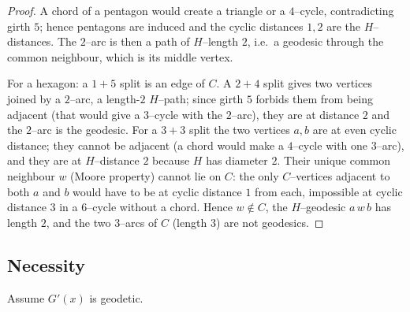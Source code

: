 \documentclass{amsart}
\theoremstyle{definition}
\begin{document}
\begin{proof}
A chord of a pentagon would create a triangle or a $4$--cycle, contradicting
girth $5$; hence pentagons are induced and the cyclic distances $1,2$ are the
$H$--distances. The $2$--arc is then a path of $H$--length $2$, i.e.\ a geodesic
through the common neighbour, which is its middle vertex.

For a hexagon: a $1{+}5$ split is an edge of $C$. A $2{+}4$ split gives two
vertices joined by a $2$--arc, a length-$2$ $H$--path; since girth $5$ forbids
them from being adjacent (that would give a $3$--cycle with the $2$--arc), they
are at distance $2$ and the $2$--arc is the geodesic. For a $3{+}3$ split the two
vertices $a,b$ are at even cyclic distance; they cannot be adjacent (a chord
would make a $4$--cycle with one $3$--arc), and they are at $H$--distance $2$
because $H$ has diameter $2$. Their unique common neighbour $w$ (Moore property)
cannot lie on $C$: the only $C$--vertices adjacent to both $a$ and $b$ would have
to be at cyclic distance $1$ from each, impossible at cyclic distance $3$ in a
$6$--cycle without a chord. Hence $w\notin C$, the $H$--geodesic $a\,w\,b$ has
length $2$, and the two $3$--arcs of $C$ (length $3$) are not geodesics.
\end{proof}

\subsection{Necessity}

Assume $G'(x)$ is geodetic.
\end{document}
